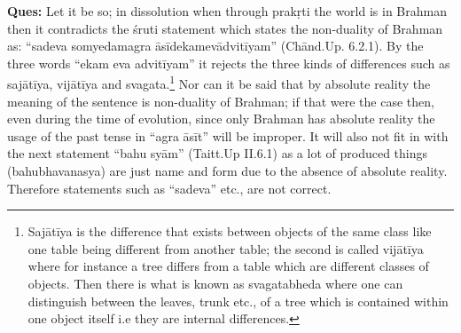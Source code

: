 \textbf{Ques:} Let it be so; in dissolution when through prakṛti the world is in Brahman then it contradicts the śruti statement which states the non-duality of Brahman as: “sadeva somyedamagra āsīdekamevādvitīyam” (Chānd.Up. 6.2.1). By the three words “ekam eva advitīyam” it rejects the three kinds of differences such as sajātīya, vijātīya and svagata.\footnote{Sajātīya is the difference that exists between objects of the same class like one table being different from another table; the second is called vijātīya where for instance a tree differs from a table which are different classes of objects. Then there is what is known as svagatabheda where one can distinguish between the leaves, trunk etc., of a tree which is contained within one object itself i.e they are internal differences.} Nor can it be said that by absolute reality the meaning of the sentence is non-duality of Brahman; if that were the case then, even during the time of evolution, since only Brahman has absolute reality the usage of the past tense in “agra āsīt” will be improper. It will also not fit in with the next statement “bahu syām” (Taitt.Up II.6.1) as a lot of produced things (bahubhavanasya) are just name and form due to the absence of absolute reality. Therefore statements such as “sadeva” etc., are not correct.

